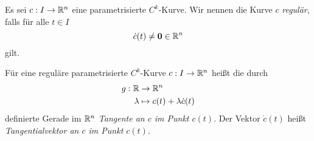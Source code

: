 \documentclass[
pdftex,
oneside,
headsepline,
11pt, 
]{scrreprt}
\begin{document}
\begin{de}
	Es sei $c:I\to\mathbb{R}^n$ eine parametrisierte $C^k$-Kurve. Wir nennen die Kurve $c$ \textit{regulär}, falls für alle $t\in I$ \[\dot{c}(t)\neq \textnormal{\textbf{0}}\in \mathbb{R}^n\] gilt.
\end{de}
\begin{bsp}
	
\end{bsp}
\begin{de}[Tangenete]
	Für eine reguläre parametrisierte $C^k$-Kurve $c:I\to\mathbb{R}^n$ heißt die durch
	\begin{align*}
	g:\mathbb{R}&\to\mathbb{R}^n\\
	\lambda&\mapsto c(t)+\lambda\dot{c}(t)
	\end{align*}
	definierte Gerade im $\mathbb{R}^n$ \textit{Tangente an $c$ im Punkt $c(t)$}. Der Vektor $\dot{c}(t)$ heißt \textit{Tangentialvektor an $c$ im Punkt $c(t)$}.
\end{de}
\end{document}
